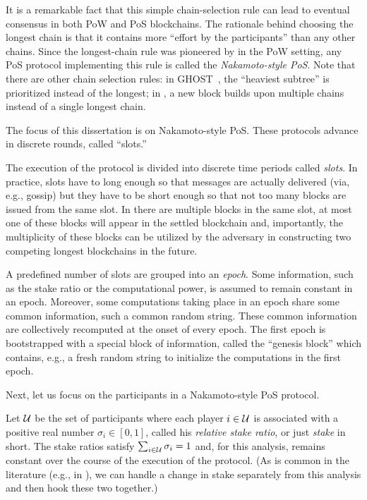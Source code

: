 It is a remarkable fact that this simple chain-selection rule 
can lead to eventual consensus in both PoW and PoS blockchains. 
The rationale behind choosing the longest chain is that 
it contains more ``effort by the participants'' than any other chains. 
Since the longest-chain rule was pioneered by \citet{Nakamoto2008} in the PoW setting, 
any PoS protocol implementing this rule is called the \emph{Nakamoto-style PoS}. 
Note that there are other chain selection rules: in GHOST~\cite{Ghost},
the ``heaviest subtree'' is prioritized instead of the longest; 
in \cite{Tangle}, a new block builds upon multiple chains instead of a single longest chain.

The focus of this dissertation is on Nakamoto-style PoS. 
These protocols advance in discrete rounds, called ``slots.''



The execution of the protocol is divided into discrete time periods called \emph{slots}. 
In practice, slots have to long enough so that 
messages are actually delivered (via, e.g., gossip) 
but they have to be short enough so that 
not too many blocks are issued from the same slot.
In there are multiple blocks in the same slot, 
at most one of these blocks will appear in the settled blockchain 
and, importantly, 
the multiplicity of these blocks can be utilized by the adversary 
in constructing two competing longest blockchains in the future.

A predefined number of slots are grouped into an \emph{epoch}. 
Some information, such as the stake ratio or the computational power, 
is assumed to remain constant in an epoch. 
Moreover, some computations taking place in an epoch 
share some common information, such a common random string. 
These common information are collectively recomputed 
at the onset of every epoch. 
The first epoch is bootstrapped with a special block of information, 
called the ``genesis block'' which contains, e.g., a fresh random string to 
initialize the computations in the first epoch.

Next, let us focus on the participants in a Nakamoto-style PoS protocol.


Let $\mathcal{U}$ be the set of participants 
where each player $i \in \mathcal{U}$ is associated with a positive real number 
$\sigma_i \in [0,1]$, called his \emph{relative stake ratio}, or just \emph{stake} in short. 
The stake ratios satisfy $\sum_{i \in \mathcal{U}} \sigma_i = 1$ 
and, for this analysis, remains constant over the course of the execution of the protocol. 
(As is common in the literature (e.g., in \cite{Ouroboros,Praos,SnowWhite}), 
we can handle a change in stake separately from this analysis and then hook these two together.)


